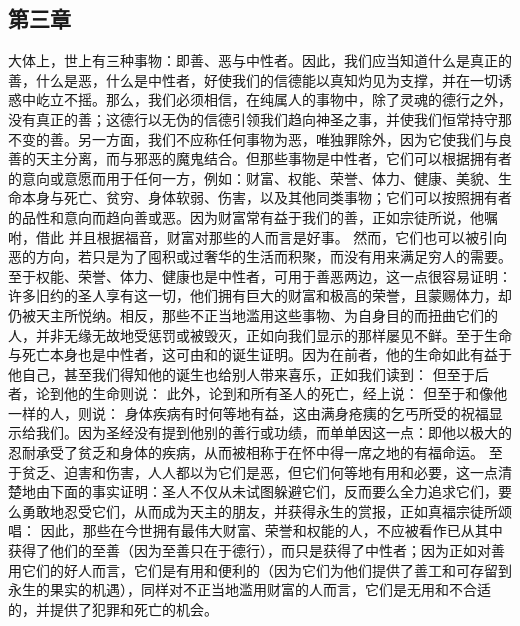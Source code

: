 
\subsection{第三章}

\par

大体上，世上有三种事物：即善、恶与中性者。因此，我们应当知道什么是真正的善，什么是恶，什么是中性者，好使我们的信德能以真知灼见为支撑，并在一切诱惑中屹立不摇。那么，我们必须相信，在纯属人的事物中，除了灵魂的德行之外，没有真正的善；这德行以无伪的信德引领我们趋向神圣之事，并使我们恒常持守那不变的善。另一方面，我们不应称任何事物为恶，唯独罪除外，因为它使我们与良善的天主分离，而与邪恶的魔鬼结合。但那些事物是中性者，它们可以根据拥有者的意向或意愿而用于任何一方，例如：财富、权能、荣誉、体力、健康、美貌、生命本身与死亡、贫穷、身体软弱、伤害，以及其他同类事物；它们可以按照拥有者的品性和意向而趋向善或恶。因为财富常有益于我们的善，正如宗徒所说，他嘱咐，借此 并且根据福音，财富对那些的人而言是好事。 然而，它们也可以被引向恶的方向，若只是为了囤积或过奢华的生活而积聚，而没有用来满足穷人的需要。至于权能、荣誉、体力、健康也是中性者，可用于善恶两边，这一点很容易证明：许多旧约的圣人享有这一切，他们拥有巨大的财富和极高的荣誉，且蒙赐体力，却仍被天主所悦纳。相反，那些不正当地滥用这些事物、为自身目的而扭曲它们的人，并非无缘无故地受惩罚或被毁灭，正如向我们显示的那样屡见不鲜。至于生命与死亡本身也是中性者，这可由和的诞生证明。因为在前者，他的生命如此有益于他自己，甚至我们得知他的诞生也给别人带来喜乐，正如我们读到： 但至于后者，论到他的生命则说： 此外，论到和所有圣人的死亡，经上说： 但至于和像他一样的人，则说： 身体疾病有时何等地有益，这由满身疮痍的乞丐所受的祝福显示给我们。因为圣经没有提到他别的善行或功绩，而单单因这一点：即他以极大的忍耐承受了贫乏和身体的疾病，从而被相称于在怀中得一席之地的有福命运。 至于贫乏、迫害和伤害，人人都以为它们是恶，但它们何等地有用和必要，这一点清楚地由下面的事实证明：圣人不仅从未试图躲避它们，反而要么全力追求它们，要么勇敢地忍受它们，从而成为天主的朋友，并获得永生的赏报，正如真福宗徒所颂唱： 因此，那些在今世拥有最伟大财富、荣誉和权能的人，不应被看作已从其中获得了他们的至善（因为至善只在于德行），而只是获得了中性者；因为正如对善用它们的好人而言，它们是有用和便利的（因为它们为他们提供了善工和可存留到永生的果实的机遇），同样对不正当地滥用财富的人而言，它们是无用和不合适的，并提供了犯罪和死亡的机会。\par

